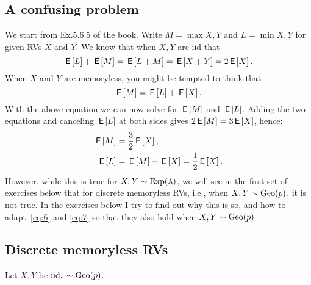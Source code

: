 \documentclass[a4paper,12pt]{article}
\begin{document}
\subsection{A confusing problem}
\label{sec:confusing-problem}

We start from Ex.5.6.5 of the book.
Write $M=\max{X,Y}$ and $L=\min{X,Y}$ for given RVs $X$ and $Y$.
We know that when $X,Y$ are iid that
\begin{equation}
  \label{eq:6}
\,\mathsf{E}\left[L\right] + \,\mathsf{E}\left[M\right] = \,\mathsf{E}\left[L+M\right]=\,\mathsf{E}\left[X+Y\right] = 2\,\mathsf{E}\left[X\right].
\end{equation}
When $X$ and $Y$ are memoryless, you might be tempted to think that
\begin{equation}
  \label{eq:7}
\,\mathsf{E}\left[M\right] = \,\mathsf{E}\left[L\right]  + \,\mathsf{E}\left[X\right].  
\end{equation}
With the above equation we can now solve for $\,\mathsf{E}\left[M\right]$ and $\,\mathsf{E}\left[L\right]$.
Adding the two equations and canceling $\,\mathsf{E}\left[L\right]$ at both sides gives $2\,\mathsf{E}\left[M\right] = 3 \,\mathsf{E}\left[X\right] $, hence:
\begin{align}
\,\mathsf{E}\left[M\right] &= \frac 3 2 \,\mathsf{E}\left[X\right],\label{eq:35}\\
\,\mathsf{E}\left[L\right] &= \,\mathsf{E}\left[M\right] - \,\mathsf{E}\left[X\right] = \frac 1 2 \,\mathsf{E}\left[X\right].\label{eq:36}
\end{align}
However, while this is true for $X, Y \sim \mathrm{Exp}(\lambda)$, we will see in the first set of exercises below  that for discrete memoryless RVs, i.e., when $X, Y \sim \mathrm{Geo}(p)$, it is not true. In the  exercises below I try to find out why this is so, and how to adapt~\cref{eq:6} and \cref{eq:7} so that they also hold when $X,Y\sim\mathrm{Geo}(p)$.




\subsection{Discrete memoryless RVs}
\label{sec:set-1}


Let $X,Y$ be $\mathrm{iid.}\, \sim \mathrm{Geo}(p)$.
\end{document}
